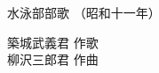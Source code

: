 \documentclass[10pt,b5j]{tarticle} %
\begin{document}
\begin{minipage}[c]{0.7\hsize} %
    \begin{center}
        {\LARGE
            水泳部部歌 %
        }
        {\small 
            （昭和十一年） %
        }
    \end{center}
\end{minipage}
\begin{minipage}[c]{0.3\hsize} %
    \begin{flushright} %
        築城武義君 作歌\\柳沢三郎君 作曲 %
    \end{flushright}
\end{minipage}
\end{document}
